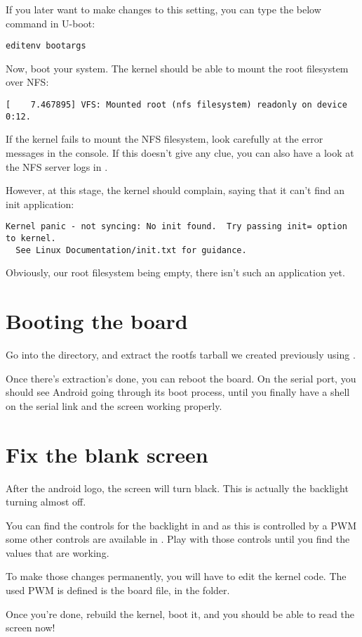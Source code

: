 If you later want to make changes to this setting, you can type the
below command in U-boot:

\begin{verbatim}
editenv bootargs
\end{verbatim}

Now, boot your system. The kernel should be able to mount the root
filesystem over NFS:

\begin{verbatim}
[    7.467895] VFS: Mounted root (nfs filesystem) readonly on device 0:12.
\end{verbatim}

If the kernel fails to mount the NFS filesystem, look carefully at the
error messages in the console. If this doesn't give any clue, you can
also have a look at the NFS server logs in .

However, at this stage, the kernel should complain, saying that it
can't find an init application:

\footnotesize
\begin{verbatim}
Kernel panic - not syncing: No init found.  Try passing init= option to kernel.
  See Linux Documentation/init.txt for guidance.
\end{verbatim}
\normalsize

Obviously, our root filesystem being empty, there isn't such an
application yet.

\section{Booting the board}

Go into the  directory, and extract the rootfs tarball
we created previously using
.

Once there's extraction's done, you can reboot the board. On the
serial port, you should see Android going through its boot process,
until you finally have a shell on the serial link and the screen
working properly.

\section{Fix the blank screen}

After the android logo, the screen will turn black. This is actually
the backlight turning almost off.

You can find the controls for the backlight in
 and as this is controlled by a PWM some
other controls are available in . Play with those
controls until you find the values that are working.

To make those changes permanently, you will have to edit the kernel
code. The used PWM is defined is the  board file, in
the  folder.

Once you're done, rebuild the kernel, boot it, and you should be able
to read the screen now!

